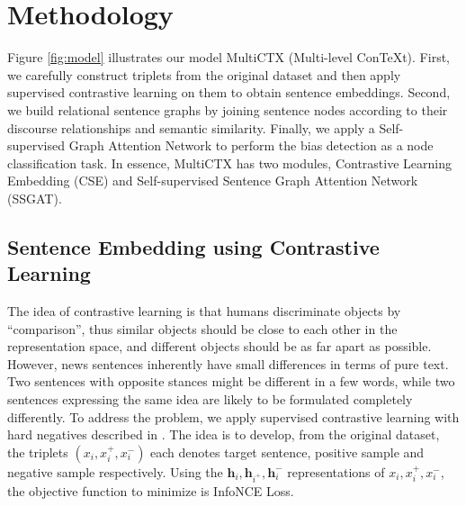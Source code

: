 \documentclass[letterpaper]{article} %
\newcommand{\KZ}[1]{\textcolor{blue}{Kenny: #1}}
\begin{document}





\section{Methodology}
Figure \ref{fig:model} illustrates our model MultiCTX (Multi-level ConTeXt). First, we carefully construct triplets from the original dataset and then apply supervised contrastive learning on them to obtain sentence embeddings. Second, we build relational sentence graphs by joining sentence nodes according to their discourse relationships and semantic similarity. Finally, we apply a Self-supervised Graph Attention Network \citep{kim2021how} to perform the bias detection as a node classification task. In essence, MultiCTX has two modules, Contrastive Learning Embedding (CSE) and Self-supervised Sentence Graph Attention Network (SSGAT).

\subsection{Sentence Embedding using Contrastive Learning}

The idea of contrastive learning is that humans discriminate objects by ``comparison'', thus similar objects should be close to each other in the representation space, and different objects should be as far apart as possible. However, news sentences inherently have small differences in terms of pure text. Two sentences with opposite stances might be different in a few words, while two sentences expressing the
same idea are likely to be formulated completely differently. To address the problem, we apply supervised contrastive learning with hard negatives described in \citet{gao2021simcse}. The idea is to develop, from the original dataset, the triplets $(x_i,x^+_i,x^-_i)$  each denotes target sentence, positive sample and negative sample respectively. Using the $\mathbf{h}_{i},\mathbf{h}_{i^+},\mathbf{h}_{i}^-$ representations of $x_i,x^+_i,x^-_i$, 
the objective function to minimize is InfoNCE Loss. 
\end{document}
